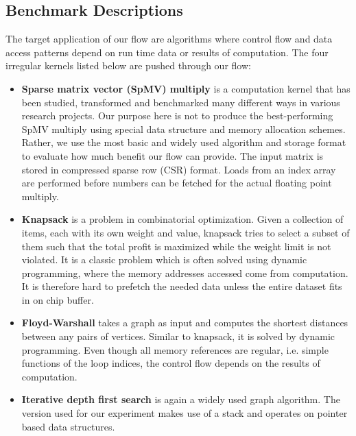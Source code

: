 \subsection{Benchmark Descriptions}
The target application of our flow are algorithms where control flow and
data access patterns depend on run time data or results of computation.
The four irregular kernels listed below are pushed through our flow:
\begin{itemize}
    \item \textbf{Sparse matrix vector (SpMV) multiply} is a computation kernel that has been studied, transformed
and benchmarked many different ways in various research projects. Our purpose here is not to produce the best-performing SpMV multiply using special data structure and memory allocation schemes. Rather, we use the most basic and widely used algorithm and storage format to evaluate how much benefit our flow can provide.
The input matrix is stored in
compressed sparse row (CSR) format. 
Loads from
an index array are performed before numbers can be fetched
for the actual floating point multiply. 

\item \textbf{Knapsack } is a problem in combinatorial optimization. Given a collection of
items, each with its own weight and value, knapsack tries to select a subset of them such that the total profit is maximized while the weight limit is not violated.
It is a classic problem which is often solved using dynamic programming, where the memory addresses accessed come from computation.
It is therefore hard to prefetch the needed data unless the entire dataset fits
in on chip buffer.

\item \textbf{Floyd-Warshall} takes a graph as input and computes the shortest distances between any pairs of vertices. Similar to knapsack, it is solved by
dynamic programming. Even though all memory references are regular, i.e. simple functions of the loop indices, the control flow depends on the results of computation.

\item \textbf{Iterative depth first search} is again a widely used graph algorithm. The version used for our experiment makes use of a stack and operates on pointer based data structures. 
 
\end{itemize}

